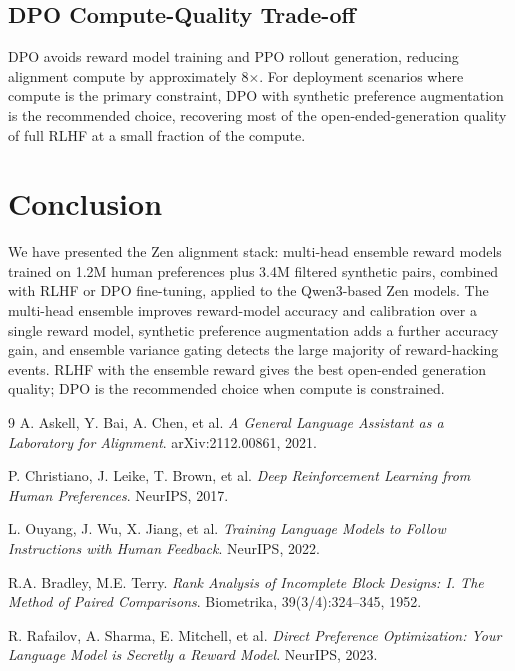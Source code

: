 \documentclass[11pt,a4paper]{article}
\begin{document}
\subsection{DPO Compute-Quality Trade-off}

DPO avoids reward model training and PPO rollout generation, reducing alignment compute
by approximately 8$\times$. For deployment scenarios where compute is the primary
constraint, DPO with synthetic preference augmentation is the recommended choice,
recovering most of the open-ended-generation quality of full RLHF at a small fraction
of the compute.

\section{Conclusion}
\label{sec:conclusion}

We have presented the Zen alignment stack: multi-head ensemble reward models trained
on 1.2M human preferences plus 3.4M filtered synthetic pairs, combined with RLHF or
DPO fine-tuning, applied to the Qwen3-based Zen models. The multi-head ensemble improves
reward-model accuracy and calibration over a single reward model, synthetic preference
augmentation adds a further accuracy gain, and ensemble variance gating detects the large
majority of reward-hacking events. RLHF with the ensemble reward gives the best
open-ended generation quality; DPO is the recommended choice when compute is constrained.

\begin{thebibliography}{9}
A. Askell, Y. Bai, A. Chen, et al.
\textit{A General Language Assistant as a Laboratory for Alignment}.
arXiv:2112.00861, 2021.

P. Christiano, J. Leike, T. Brown, et al.
\textit{Deep Reinforcement Learning from Human Preferences}.
NeurIPS, 2017.

L. Ouyang, J. Wu, X. Jiang, et al.
\textit{Training Language Models to Follow Instructions with Human Feedback}.
NeurIPS, 2022.

R.A. Bradley, M.E. Terry.
\textit{Rank Analysis of Incomplete Block Designs: I. The Method of Paired Comparisons}.
Biometrika, 39(3/4):324--345, 1952.

R. Rafailov, A. Sharma, E. Mitchell, et al.
\textit{Direct Preference Optimization: Your Language Model is Secretly a Reward Model}.
NeurIPS, 2023.
\end{thebibliography}
\end{document}

